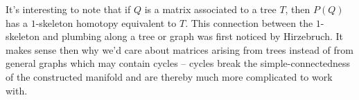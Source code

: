 It's interesting to note that if $Q$ is a matrix associated to a tree $T$, then $P(Q)$ has a $1$-skeleton homotopy equivalent to $T$. This connection between the $1$-skeleton and plumbing along a tree or graph was first noticed by Hirzebruch. It makes sense then why we'd care about matrices arising from trees instead of from general graphs which may contain cycles -- cycles break the simple-connectedness of the constructed manifold and are thereby much more complicated to work with.

%
%
%
%
%
%
%
%
%
%
